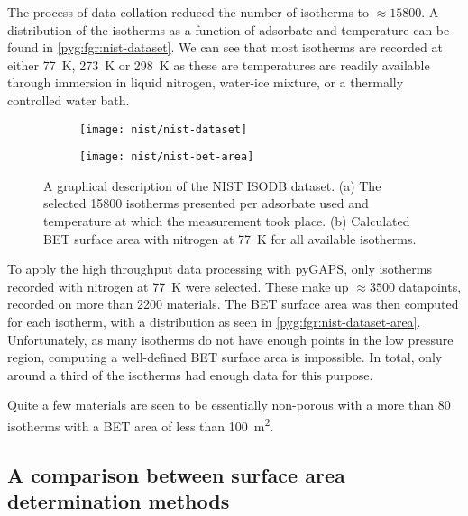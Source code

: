 The process of data collation reduced the number of isotherms
to \(\approx \! 15800\). A distribution of the isotherms as a 
function of adsorbate and temperature can be found 
in \autoref{pyg:fgr:nist-dataset}.
We can see that most isotherms are recorded at either 
\SI{77}{\kelvin}, \SI{273}{\kelvin} or \SI{298}{\kelvin} as 
these are temperatures are readily available through immersion
in liquid nitrogen, water-ice mixture, or a thermally controlled
water bath.

\begin{figure}[htb]
    \centering

    \begin{subfigure}{0.5\linewidth}
        \texttt{[image: nist/nist-dataset]}%
        \caption{}%
        \label{pyg:fgr:nist-dataset}
    \end{subfigure}%
    \begin{subfigure}{0.4\linewidth}
        \texttt{[image: nist/nist-bet-area]}%
        \caption{}%
        \label{pyg:fgr:nist-dataset-area}
    \end{subfigure}%

    \caption{A graphical description of the NIST ISODB dataset.
    (a) The selected 15800 isotherms presented per adsorbate used
    and temperature at which the measurement took place.
    (b) Calculated BET surface area with nitrogen at \SI{77}{\kelvin}
    for all available isotherms. }%
    \label{pyg:fgr:nist-set}
\end{figure}

To apply the high throughput data processing with pyGAPS,
only isotherms recorded with nitrogen at \SI{77}{\kelvin}
were selected. These make up \(\approx \! 3500\) datapoints,
recorded on more than 2200 materials. The BET surface area 
was then computed for each isotherm, with a distribution
as seen in \autoref{pyg:fgr:nist-dataset-area}.
Unfortunately, as many isotherms do not have enough points
in the low pressure region, computing a well-defined
BET surface area is impossible. In total, only around a
third of the isotherms had enough data for this purpose.

Quite a few materials are seen to be essentially non-porous
with a more than 80 isotherms with a BET area of less 
than \SI{100}{\metre^2}.

\subsection{A comparison between surface area determination methods}

